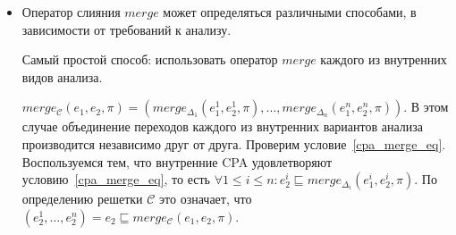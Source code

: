 \begin{itemize}


\item 
Оператор слияния $merge$ может определяться различными способами, в зависимости от требований к анализу.

Самый простой способ: использовать оператор $merge$ каждого из внутренних видов анализа.

$merge_{\mathscr{C}}(e_1,e_2,\pi) = (merge_{\Delta_1}(e_1^1, e_2^1,\pi), \dots, merge_{\Delta_n}(e_1^n, e_2^n,\pi))$.
В этом случае объединение переходов каждого из внутренних вариантов анализа производится независимо друг от друга.
Проверим условие~\ref{cpa_merge_eq}.
Воспользуемся тем, что внутренние CPA удовлетворяют условию~\ref{cpa_merge_eq}, то есть $\forall 1 \le i \le n: e_2^i \sqsubseteq merge_{\Delta_i}(e_1^i, e_2^i,\pi)$.
По определению решетки $\mathscr{C}$ это означает, что $(e_2^1, \dots, e_2^n) = e_2 \sqsubseteq merge_{\mathscr{C}}(e_1,e_2,\pi)$.


\end{itemize}
